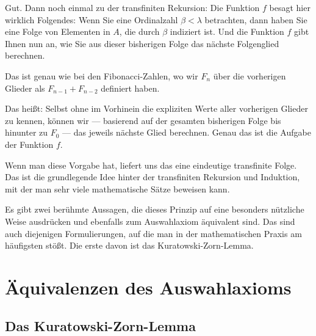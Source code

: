 \begin{spoken-clean}[00:56:40 - 00:58:10]
Gut. Dann noch einmal zu der transfiniten Rekursion: Die Funktion $f$ besagt hier wirklich Folgendes: Wenn Sie eine Ordinalzahl $\beta < \lambda$ betrachten, dann haben Sie eine Folge von Elementen in $A$, die durch $\beta$ indiziert ist. Und die Funktion $f$ gibt Ihnen nun an, wie Sie aus dieser bisherigen Folge das nächste Folgenglied berechnen.

Das ist genau wie bei den Fibonacci-Zahlen, wo wir $F_n$ über die vorherigen Glieder als $F_{n-1} + F_{n-2}$ definiert haben.
\end{spoken-clean}

\begin{spoken-clean}[00:58:10 - 00:59:10]
Das heißt: Selbst ohne im Vorhinein die expliziten Werte aller vorherigen Glieder zu kennen, können wir --- basierend auf der gesamten bisherigen Folge bis hinunter zu $F_0$ --- das jeweils nächste Glied berechnen. Genau das ist die Aufgabe der Funktion $f$.

Wenn man diese Vorgabe hat, liefert uns das eine eindeutige transfinite Folge. Das ist die grundlegende Idee hinter der transfiniten Rekursion und Induktion, mit der man sehr viele mathematische Sätze beweisen kann.

Es gibt zwei berühmte Aussagen, die dieses Prinzip auf eine besonders nützliche Weise ausdrücken und ebenfalls zum Auswahlaxiom äquivalent sind. Das sind auch diejenigen Formulierungen, auf die man in der mathematischen Praxis am häufigsten stößt. Die erste davon ist das Kuratowski-Zorn-Lemma.
\end{spoken-clean}

\section{Äquivalenzen des Auswahlaxioms}
\subsection{Das Kuratowski-Zorn-Lemma}

